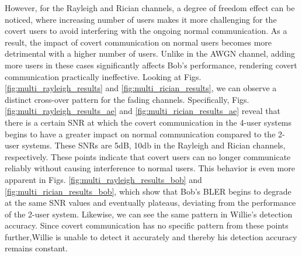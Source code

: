 However, for the Rayleigh and Rician channels, a degree of freedom effect can be noticed, where increasing number of users makes it more challenging for the covert users to avoid interfering with the ongoing normal communication. As a result, the impact of covert communication on normal users becomes more detrimental with a higher number of users. Unlike in the AWGN channel, adding more users in these cases significantly affects Bob's performance, rendering covert communication practically ineffective. Looking at Figs. \ref{fig:multi_rayleigh_results} and \ref{fig:multi_rician_results}, we can observe a distinct cross-over pattern for the fading channels. Specifically, Figs. \ref{fig:multi_rayleigh_results_ae} and \ref{fig:multi_rician_results_ae} reveal that there is a certain SNR at which the covert communication in the 4-user systems begins to have a greater impact on normal communication compared to the 2-user systems. These SNRs are 5dB, 10db in the Rayleigh and Rician channels, respectively. These points indicate that covert users can no longer communicate reliably without causing interference to normal users. This behavior is even more apparent in Figs. \ref{fig:multi_rayleigh_results_bob} and \ref{fig:multi_rician_results_bob}, which show that Bob's BLER begins to degrade at the same SNR values and eventually plateaus, deviating from the performance of the 2-user system. Likewise, we can see the same pattern in Willie's detection accuracy. Since covert communication has no specific pattern from these points further,Willie is unable to detect it accurately and thereby his detection accuracy remains constant.


